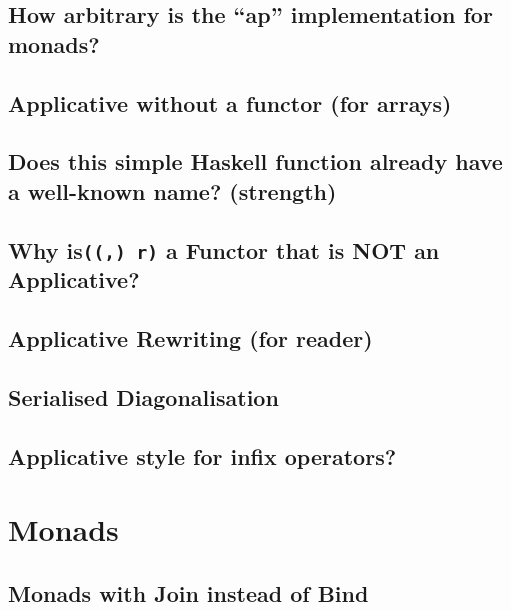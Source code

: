 \documentclass{book}
\begin{document}
\section{How arbitrary is the “ap” implementation for monads?}


\section{Applicative without a functor (for arrays)}


\section{Does this simple Haskell function already have a well-known name? (strength)}


\section{Why is{\tt ((,) r)} a Functor that is NOT an Applicative?}


\section{Applicative Rewriting (for reader)}


\section{Serialised Diagonalisation}


\section{Applicative style for infix operators?}



\chapter{Monads}

\section{Monads with Join instead of Bind}

\end{document}
